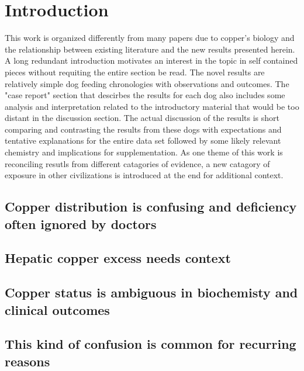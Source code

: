 \newpage
\newcommand{\mjmguide}[1]{ \subsection{#1}}

\section{Introduction  }

This work is organized differently from many papers
due to copper's biology and the relationship between existing
literature and the new results presented herein.
A long redundant introduction  motivates an interest in the topic
in self contained pieces without requiting the entire section  be read.
The novel results are relatively simple dog feeding chronologies
with  observations and outcomes. The "case report" section that
descirbes the results for each dog also includes some analysis
and interpretation related to the   introductory material that would
be too distant in the discussion section. 
The actual discussion of the results is short  comparing 
and contrasting the results
from these dogs with expectations and tentative explanations for
the entire data set  followed by some likely relevant chemistry and 
implications for supplementation. As one theme  of this work is reconciling
resutls from different catagories of evidence, a new catagory 
of exposure in other civilizations is introduced at the end for additional
context.  

\mjmguide{ Copper distribution is confusing and deficiency often ignored by doctors}

\mjmintro


\mjmguide{ Hepatic copper excess needs context  }

\mjmmislead


\mjmguide{ Copper status is ambiguous in biochemisty and clinical outcomes   }

\mjmambig

\begin{comment}
\mjmguide{ Copper and blood pressure   }

\mjmcubp

\end{comment}

\mjmguide{ This kind of confusion is common for recurring reasons   }

\mjmconfuse


